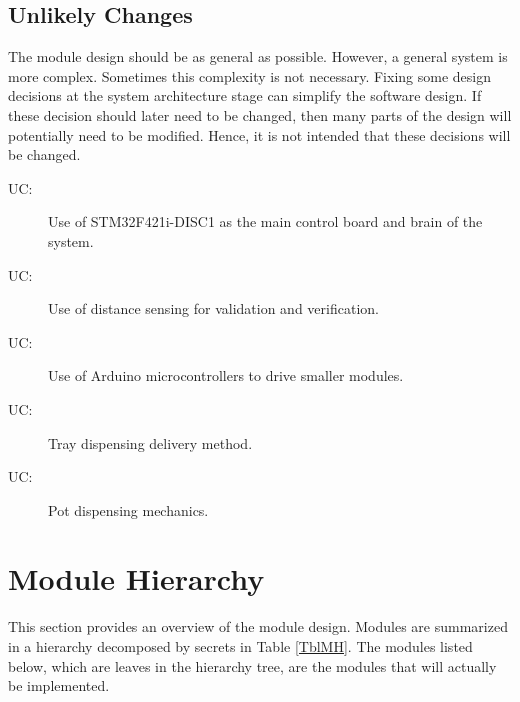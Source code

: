 \documentclass[12pt, titlepage]{article}
\newcounter{ucnum}
\newcommand{\uctheucnum}{UC\theucnum}
\begin{document}
\subsection{Unlikely Changes} \label{SecUchange}

The module design should be as general as possible. However, a general system is
more complex. Sometimes this complexity is not necessary. Fixing some design
decisions at the system architecture stage can simplify the software design. If
these decision should later need to be changed, then many parts of the design
will potentially need to be modified. Hence, it is not intended that these
decisions will be changed.

\begin{description}
\item[ \uctheucnum \label{ucIO}:] Use of STM32F421i-DISC1 
as the main control board and brain of the system.
\item[ \uctheucnum \label{ucIO}:] Use of distance sensing for
validation and verification.
\item[ \uctheucnum \label{ucIO}:] Use of Arduino microcontrollers to drive 
smaller modules.
\item[ \uctheucnum \label{ucIO}:] Tray dispensing delivery method.
\item[ \uctheucnum \label{ucIO}:] Pot dispensing mechanics. 
\end{description}

\newpage


\section{Module Hierarchy} \label{SecMH}

This section provides an overview of the module design. Modules are summarized
in a hierarchy decomposed by secrets in Table \ref{TblMH}. The modules listed
below, which are leaves in the hierarchy tree, are the modules that will
actually be implemented.
\end{document}
